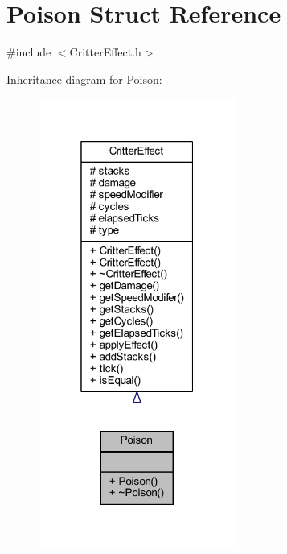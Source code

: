 \hypertarget{struct_poison}{\section{Poison Struct Reference}
\label{struct_poison}
}


{\ttfamily \#include $<$Critter\+Effect.\+h$>$}



Inheritance diagram for Poison\+:\nopagebreak
\begin{figure}[H]
\begin{center}
\leavevmode
\includegraphics[width=184pt]{struct_poison__inherit__graph}
\end{center}
\end{figure}


